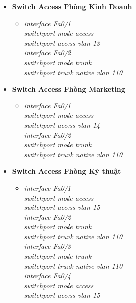 \documentclass[12pt,a4paper]{report}
\begin{document}
\begin{itemize}
\begin{itemize}
\begin{itemize}
    \end{itemize}
     \item \textbf{Switch Access Phòng Kinh Doanh}
     \begin{itemize}
      \item \textit{interface Fa0/1\\
switchport mode access\\
switchport access vlan 13\\
interface Fa0/2\\
switchport mode trunk\\
switchport trunk native vlan 110\\}
     
    \end{itemize}
     \item \textbf{Switch Access Phòng Marketing}
     \begin{itemize}
      \item \textit{interface Fa0/1\\
switchport mode access\\
switchport access vlan 14\\
interface Fa0/2\\
switchport mode trunk\\
switchport trunk native vlan 110\\}
     
    \end{itemize}
     \item \textbf{Switch Access Phòng Kỹ thuật}
     \begin{itemize}
      \item \textit{interface Fa0/1\\
switchport mode access\\
switchport access vlan 15\\
interface Fa0/2\\
switchport mode trunk\\
switchport trunk native vlan 110\\
interface Fa0/3\\
switchport mode trunk\\
switchport trunk native vlan 110\\
interface Fa0/4\\
switchport mode access\\
switchport access vlan 15\\}
     

\end{itemize}
\end{itemize}
\end{itemize}
\end{document}

